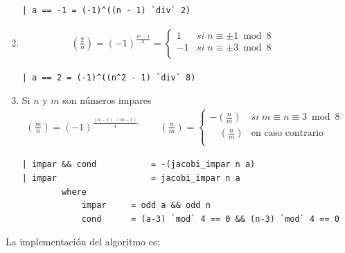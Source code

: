\documentclass[10pt,spanish]{article}
\begin{document}
\begin{enumerate}[1.]
\begin{verbatim}
| a == -1 = (-1)^((n - 1) `div` 2)
\end{verbatim}

\item
\begin{equation*}
    \begin{aligned}
    \left( \frac{2}{n} \right) = (-1)^{\frac{n^2-1}{2}} = \begin{cases}
        1 & si \;n \equiv \pm 1 \bmod 8 \\
        -1 & si \;n \equiv \pm 3 \bmod 8\\
        \end{cases}
    \end{aligned}
    \phantom{\hspace{12cm}}
\end{equation*}

\begin{verbatim}
| a == 2 = (-1)^((n^2 - 1) `div` 8)
\end{verbatim}

\item Si $n$ y $m$ son números impares
\begin{equation*}
    \begin{aligned}
    \left( \frac{m}{n} \right) = (-1)^{\frac{(n-1)\cdot(m-1)}{4}} \qquad\ \left( \frac{n}{m} \right) = \begin{cases}
        - \left( \frac{n}{m} \right) & si \;m \equiv n \equiv 3 \bmod 8 \\
        \quad\left( \frac{n}{m} \right) & \text{en caso contrario}\\
        \end{cases}
    \end{aligned}
    \phantom{\hspace{12cm}}
\end{equation*}

\begin{verbatim}
| impar && cond           = -(jacobi_impar n a)
| impar                   = jacobi_impar n a
        where
            impar     = odd a && odd n 
            cond      = (a-3) `mod` 4 == 0 && (n-3) `mod` 4 == 0
\end{verbatim}
\end{enumerate}

La implementación del algoritmo es:
\end{document}
